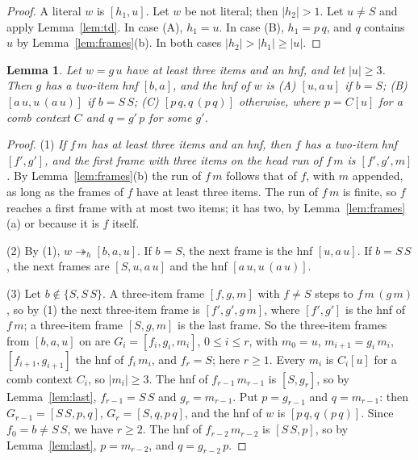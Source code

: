 \documentclass[11pt]{amsart}
\newtheorem{lemma}[theorem]{Lemma}
\newcommand{\hred}{\twoheadrightarrow_h}
\newcommand{\sz}[1]{\lvert#1\rvert}
\newcommand{\fr}[1]{[#1]}
\begin{document}
\begin{proof}
A literal $w$ is $\fr{h_1,u}$. Let $w$ be not literal; then $\sz{h_2}>1$. Let $u\ne S$ and apply
Lemma~\ref{lem:td}. In case (A), $h_1=u$. In case (B), $h_1=p\,q$, and $q$ contains $u$ by
Lemma~\ref{lem:frames}(b). In both cases $\sz{h_2}>\sz{h_1}\ge\sz u$.
\end{proof}

\begin{lemma}\label{lem:dstar}
Let $w=g\,u$ have at least three items and an hnf, and let $\sz u\ge3$. Then $g$ has a two-item hnf
$\fr{b,a}$, and the hnf of $w$ is \textup{(A)} $\fr{u,a\,u}$ if $b=S$; \textup{(B)}
$\fr{a\,u,u\,(a\,u)}$ if $b=S\,S$; \textup{(C)} $\fr{p\,q,q\,(p\,q)}$ otherwise, where $p=C[u]$ for a
comb context $C$ and $q=g'\,p$ for some $g'$.
\end{lemma}

\begin{proof}
(1) \emph{If $f\,m$ has at least three items and an hnf, then $f$ has a two-item hnf $\fr{f',g'}$,
and the first frame with three items on the head run of $f\,m$ is $\fr{f',g',m}$.} By
Lemma~\ref{lem:frames}(b) the run of $f\,m$ follows that of $f$, with $m$ appended, as long as the
frames of $f$ have at least three items. The run of $f\,m$ is finite, so $f$ reaches a first frame
with at most two items; it has two, by Lemma~\ref{lem:frames}(a) or because it is $f$ itself.

(2) By (1), $w\hred\fr{b,a,u}$. If $b=S$, the next frame is the hnf $\fr{u,a\,u}$. If $b=S\,S$, the
next frames are $\fr{S,u,a\,u}$ and the hnf $\fr{a\,u,u\,(a\,u)}$.

(3) Let $b\notin\{S,S\,S\}$. A three-item frame $\fr{f,g,m}$ with $f\ne S$ steps to
$f\,m\,(g\,m)$, so by (1) the next three-item frame is $\fr{f',g',g\,m}$, where $\fr{f',g'}$ is the
hnf of $f\,m$; a three-item frame $\fr{S,g,m}$ is the last frame. So the three-item frames from
$\fr{b,a,u}$ on are $G_i=\fr{f_i,g_i,m_i}$, $0\le i\le r$, with $m_0=u$, $m_{i+1}=g_i\,m_i$,
$\fr{f_{i+1},g_{i+1}}$ the hnf of $f_i\,m_i$, and $f_r=S$; here $r\ge1$. Every $m_i$ is $C_i[u]$ for a
comb context $C_i$, so $\sz{m_i}\ge3$. The hnf of $f_{r-1}\,m_{r-1}$ is $\fr{S,g_r}$, so by
Lemma~\ref{lem:last}, $f_{r-1}=S\,S$ and $g_r=m_{r-1}$. Put $p=g_{r-1}$ and $q=m_{r-1}$: then
$G_{r-1}=\fr{S\,S,p,q}$, $G_r=\fr{S,q,p\,q}$, and the hnf of $w$ is $\fr{p\,q,q\,(p\,q)}$. Since
$f_0=b\ne S\,S$, we have $r\ge2$. The hnf of $f_{r-2}\,m_{r-2}$ is $\fr{S\,S,p}$, so by
Lemma~\ref{lem:last}, $p=m_{r-2}$, and $q=g_{r-2}\,p$.
\end{proof}
\end{document}
